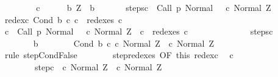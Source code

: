 \begin{isabellebody}
\ \ \isamarkupfalse%
\isanewline
\ \ \ \ \isamarkupfalse%
\ c{\isacharprime}\isanewline
\ \ \ \ \isamarkupfalse%
\ b{\isacharcolon}\ {\isachardoublequoteopen}Z\ {\isasymnotin}\ b{\isachardoublequoteclose}\ \isanewline
\ \ \ \ \isamarkupfalse%
\ steps{\isacharunderscore}c{\isacharprime}{\isacharcolon}\ {\isachardoublequoteopen}{\isasymGamma}{\isasymturnstile}\ {\isacharparenleft}Call\ p{\isacharcomma}\ Normal\ {\isasymsigma}{\isacharparenright}\ {\isasymrightarrow}\isactrlsup {\isacharplus}\ {\isacharparenleft}c{\isacharprime}{\isacharcomma}\ Normal\ Z{\isacharparenright}{\isachardoublequoteclose}\isanewline
\ \ \ \ \isamarkupfalse%
\ redex{\isacharunderscore}c{\isacharprime}{\isacharcolon}\ {\isachardoublequoteopen}Cond\ b\ c{}\ c{}\ {\isasymin}\ redexes\ c{\isacharprime}{\isachardoublequoteclose}\isanewline
\ \ \ \ \isamarkupfalse%
\ {\isachardoublequoteopen}{\isasymexists}c{\isacharprime}{\isachardot}\ {\isasymGamma}{\isasymturnstile}\ {\isacharparenleft}Call\ p{\isacharcomma}\ Normal\ {\isasymsigma}{\isacharparenright}\ {\isasymrightarrow}\isactrlsup {\isacharplus}\ {\isacharparenleft}c{\isacharprime}{\isacharcomma}\ Normal\ Z{\isacharparenright}\ {\isasymand}\ c{}\ {\isasymin}\ redexes\ c{\isacharprime}{\isachardoublequoteclose}\isanewline
\ \ \ \ \isamarkupfalse%
\ {\isacharminus}\isanewline
\ \ \ \ \ \ \isamarkupfalse%
\ steps{\isacharunderscore}c{\isacharprime}\isanewline
\ \ \ \ \ \ \isamarkupfalse%
\isanewline
\ \ \ \ \ \ \isamarkupfalse%
\ b\isanewline
\ \ \ \ \ \ \isamarkupfalse%
\ {\isachardoublequoteopen}{\isasymGamma}{\isasymturnstile}{\isacharparenleft}Cond\ b\ c{}\ c{}{\isacharcomma}\ Normal\ Z{\isacharparenright}\ {\isasymrightarrow}\ {\isacharparenleft}c{}{\isacharcomma}\ Normal\ Z{\isacharparenright}{\isachardoublequoteclose}\isanewline
\ \ \ \ \ \ \ \ \isamarkupfalse%
\ {\isacharparenleft}rule\ step{\isachardot}CondFalse{\isacharparenright}\isanewline
\ \ \ \ \ \ \isamarkupfalse%
\ step{\isacharunderscore}redexes\ {\isacharbrackleft}OF\ this\ redex{\isacharunderscore}c{\isacharprime}{\isacharbrackright}\ \isamarkupfalse%
\ c{\isacharprime}{\isacharprime}\ \isanewline
\ \ \ \ \ \ \ \ step{\isacharunderscore}c{\isacharprime}{\isacharprime}{\isacharcolon}\ {\isachardoublequoteopen}{\isasymGamma}{\isasymturnstile}\ {\isacharparenleft}c{\isacharprime}{\isacharcomma}\ Normal\ Z{\isacharparenright}\ {\isasymrightarrow}\ {\isacharparenleft}c{\isacharprime}{\isacharprime}{\isacharcomma}\ Normal\ Z{\isacharparenright}{\isachardoublequoteclose}\ \ \isanewline

\end{isabellebody}
